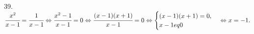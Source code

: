 39. $\cfrac{x^2}{x-1}=\cfrac{1}{x-1}\Leftrightarrow\cfrac{x^2-1}{x-1}=0\Leftrightarrow \cfrac{(x-1)(x+1)}{x-1}=0\Leftrightarrow
\begin{cases} (x-1)(x+1)=0, \\ x-1
eq0 \end{cases} \Leftrightarrow x=-1.$\\
